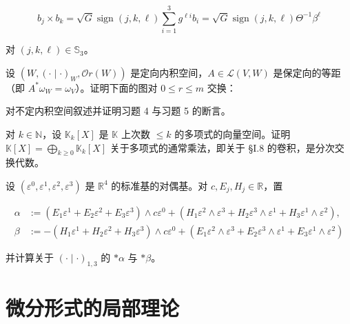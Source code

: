\begin{exercises}
\[
b_{j}\times b_{k} = \sqrt{G}\operatorname{sign}(j,k,\ell)\sum_{i=1}^{3}g^{\ell i}b_{i} = \sqrt{G}\operatorname{sign}(j,k,\ell)\Theta^{-1}\beta^{\ell}
\]

对 $ (j,k,\ell) \in \mathbb{S}_{3} $。

\item

设 $ (W,(\cdot\mid\cdot)_{W},\mathcal{O}r(W)) $ 是定向内积空间，$ A \in \mathcal{L}(V,W) $ 是保定向的等距（即 $ A^{*}\omega_{W} = \omega_{V} $）。证明下面的图对 $ 0 \le r \le m $ 交换：


\item

对不定内积空间叙述并证明习题 4 与习题 5 的断言。

\item

对 $ k \in \mathbb{N} $，设 $ \mathbb{K}_{k}[X] $ 是 $ \mathbb{K} $ 上次数 $ \le k $ 的多项式的向量空间。证明 $ \mathbb{K}[X] = \bigoplus_{k\ge 0}\mathbb{K}_{k}[X] $ 关于多项式的通常乘法，即关于 §I.8 的卷积，是分次交换代数。

\item

设 $ (\varepsilon^{0},\varepsilon^{1},\varepsilon^{2},\varepsilon^{3}) $ 是 $ \mathbb{R}^{4} $ 的标准基的对偶基。对 $ c,E_{j},H_{j} \in \mathbb{R} $，置

\begin{equation*}
\begin{aligned}
\alpha &:= (E_{1}\varepsilon^{1} + E_{2}\varepsilon^{2} + E_{3}\varepsilon^{3})\wedge c\varepsilon^{0} + (H_{1}\varepsilon^{2}\wedge\varepsilon^{3} + H_{2}\varepsilon^{3}\wedge\varepsilon^{1} + H_{3}\varepsilon^{1}\wedge\varepsilon^{2}), \\ \beta &:= -(H_{1}\varepsilon^{1} + H_{2}\varepsilon^{2} + H_{3}\varepsilon^{3})\wedge c\varepsilon^{0} + (E_{1}\varepsilon^{2}\wedge\varepsilon^{3} + E_{2}\varepsilon^{3}\wedge\varepsilon^{1} + E_{3}\varepsilon^{1}\wedge\varepsilon^{2})
\end{aligned}
\end{equation*}

并计算关于 $ (\cdot\mid\cdot)_{1,3} $ 的 $ \ast\alpha $ 与 $ \ast\beta $。

\end{exercises}

\section{微分形式的局部理论}

